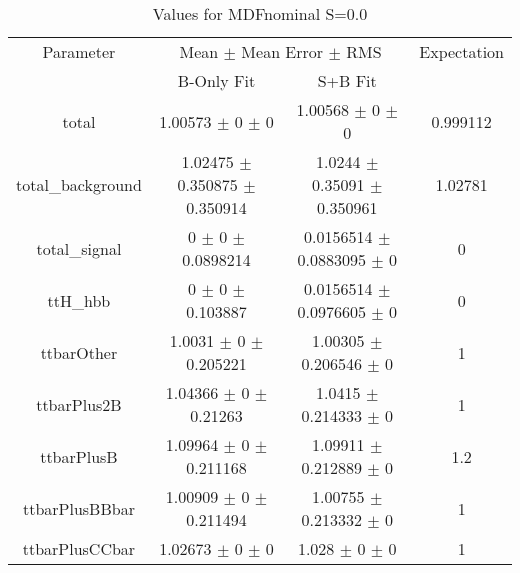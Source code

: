 \begin{table}
\centering
\caption{Values for MDFnominal S=0.0}
\begin{tabular}{cccc}
\toprule
Parameter & \multicolumn{2}{c}{Mean $\pm$ Mean Error $\pm$ RMS} & Expectation\\
 & B-Only Fit & S+B Fit & \\
\midrule
total & \num{1.00573} $\pm$ \num{0} $\pm$ \num{0} & \num{1.00568} $\pm$ \num{0} $\pm$ \num{0} & \num{0.999112}\\
total\_background & \num{1.02475} $\pm$ \num{0.350875} $\pm$ \num{0.350914} & \num{1.0244} $\pm$ \num{0.35091} $\pm$ \num{0.350961} & \num{1.02781}\\
total\_signal & \num{0} $\pm$ \num{0} $\pm$ \num{0.0898214} & \num{0.0156514} $\pm$ \num{0.0883095} $\pm$ \num{0} & \num{0}\\
ttH\_hbb & \num{0} $\pm$ \num{0} $\pm$ \num{0.103887} & \num{0.0156514} $\pm$ \num{0.0976605} $\pm$ \num{0} & \num{0}\\
ttbarOther & \num{1.0031} $\pm$ \num{0} $\pm$ \num{0.205221} & \num{1.00305} $\pm$ \num{0.206546} $\pm$ \num{0} & \num{1}\\
ttbarPlus2B & \num{1.04366} $\pm$ \num{0} $\pm$ \num{0.21263} & \num{1.0415} $\pm$ \num{0.214333} $\pm$ \num{0} & \num{1}\\
ttbarPlusB & \num{1.09964} $\pm$ \num{0} $\pm$ \num{0.211168} & \num{1.09911} $\pm$ \num{0.212889} $\pm$ \num{0} & \num{1.2}\\
ttbarPlusBBbar & \num{1.00909} $\pm$ \num{0} $\pm$ \num{0.211494} & \num{1.00755} $\pm$ \num{0.213332} $\pm$ \num{0} & \num{1}\\
ttbarPlusCCbar & \num{1.02673} $\pm$ \num{0} $\pm$ \num{0} & \num{1.028} $\pm$ \num{0} $\pm$ \num{0} & \num{1}\\
\bottomrule
\end{tabular}
\end{table}